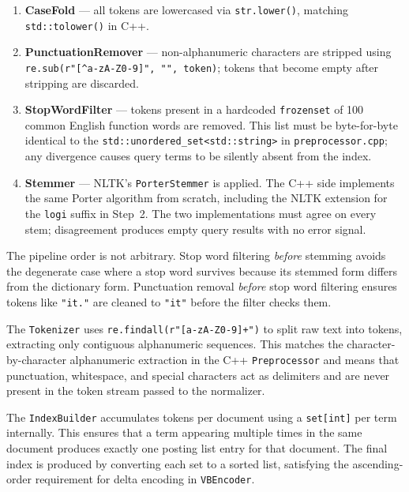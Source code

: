 \documentclass[twocolumn, 10pt]{article}
\begin{document}
\begin{enumerate}[leftmargin=*, noitemsep]
    \item \textbf{CaseFold} --- all tokens are lowercased via
          \texttt{str.lower()}, matching \texttt{std::tolower()} in C++.
    \item \textbf{PunctuationRemover} --- non-alphanumeric characters are
          stripped using \texttt{re.sub(r"[\^{}a-zA-Z0-9]", "", token)};
          tokens that become empty after stripping are discarded.
    \item \textbf{StopWordFilter} --- tokens present in a hardcoded
          \texttt{frozenset} of 100 common English function words are
          removed. This list must be byte-for-byte identical to the
          \texttt{std::unordered\_set<std::string>} in
          \texttt{preprocessor.cpp}; any divergence causes query terms
          to be silently absent from the index.
    \item \textbf{Stemmer} --- NLTK's \texttt{PorterStemmer} is applied.
          The C++ side implements the same Porter algorithm from scratch,
          including the NLTK extension for the \texttt{logi} suffix in
          Step~2. The two implementations must agree on every stem;
          disagreement produces empty query results with no error signal.
\end{enumerate}

The pipeline order is not arbitrary. Stop word filtering \textit{before}
stemming avoids the degenerate case where a stop word survives because its
stemmed form differs from the dictionary form. Punctuation removal
\textit{before} stop word filtering ensures tokens like \texttt{"it."} are
cleaned to \texttt{"it"} before the filter checks them.

The \texttt{Tokenizer} uses \texttt{re.findall(r"[a-zA-Z0-9]+")} to split
raw text into tokens, extracting only contiguous alphanumeric sequences.
This matches the character-by-character alphanumeric extraction in the C++
\texttt{Preprocessor} and means that punctuation, whitespace, and special
characters act as delimiters and are never present in the token stream
passed to the normalizer.

The \texttt{IndexBuilder} accumulates tokens per document using a
\texttt{set[int]} per term internally. This ensures that a term appearing
multiple times in the same document produces exactly one posting list entry
for that document. The final index is produced by converting each set to a
sorted list, satisfying the ascending-order requirement for delta encoding
in \texttt{VBEncoder}.
\end{document}
